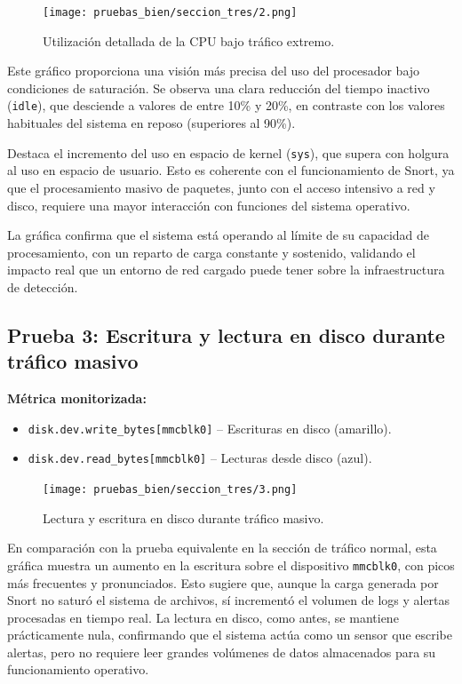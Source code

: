 \documentclass[11pt,a4paper,twoside]{report}
\begin{document}
\begin{figure}[H]
	\centering
	\texttt{[image: pruebas\_bien/seccion\_tres/2.png]}
	\caption{Utilización detallada de la CPU bajo tráfico extremo.}
\end{figure}

Este gráfico proporciona una visión más precisa del uso del procesador bajo condiciones de saturación. Se observa una clara reducción del tiempo inactivo (\texttt{idle}), que desciende a valores de entre 10\% y 20\%, en contraste con los valores habituales del sistema en reposo (superiores al 90\%).\newline

Destaca el incremento del uso en espacio de kernel (\texttt{sys}), que supera con holgura al uso en espacio de usuario. Esto es coherente con el funcionamiento de Snort, ya que el procesamiento masivo de paquetes, junto con el acceso intensivo a red y disco, requiere una mayor interacción con funciones del sistema operativo.\newline

La gráfica confirma que el sistema está operando al límite de su capacidad de procesamiento, con un reparto de carga constante y sostenido, validando el impacto real que un entorno de red cargado puede tener sobre la infraestructura de detección.

\subsection*{Prueba 3: Escritura y lectura en disco durante tráfico masivo}

\textbf{Métrica monitorizada:}
\begin{itemize}
	\item \texttt{disk.dev.write\_bytes[mmcblk0]} – Escrituras en disco (amarillo).
	\item \texttt{disk.dev.read\_bytes[mmcblk0]} – Lecturas desde disco (azul).
\end{itemize}

\begin{figure}[H]
	\centering
	\texttt{[image: pruebas\_bien/seccion\_tres/3.png]}
	\caption{Lectura y escritura en disco durante tráfico masivo.}
\end{figure}

En comparación con la prueba equivalente en la sección de tráfico normal, esta gráfica muestra un aumento en la escritura sobre el dispositivo \texttt{mmcblk0}, con picos más frecuentes y pronunciados. Esto sugiere que, aunque la carga generada por Snort no saturó el sistema de archivos, sí incrementó el volumen de logs y alertas procesadas en tiempo real. La lectura en disco, como antes, se mantiene prácticamente nula, confirmando que el sistema actúa como un sensor que escribe alertas, pero no requiere leer grandes volúmenes de datos almacenados para su funcionamiento operativo.
\end{document}
